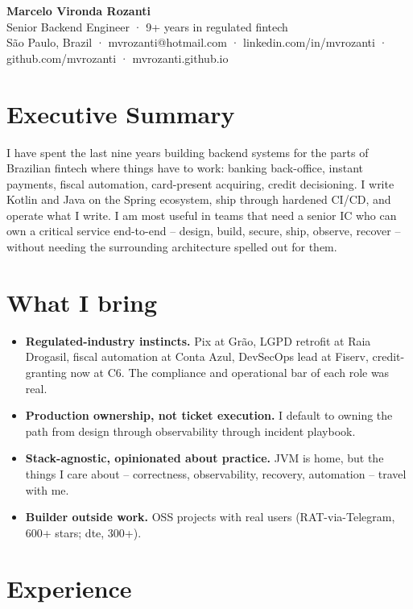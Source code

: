 \documentclass[11pt,a4paper]{article}
\begin{document}
\begin{center}
{\Huge\bfseries Marcelo Vironda Rozanti}\\[4pt]
{\large\color{accent} Senior Backend Engineer · 9+ years in regulated fintech}\\[3pt]
{\small São Paulo, Brazil · mvrozanti@hotmail.com · linkedin.com/in/mvrozanti · github.com/mvrozanti · mvrozanti.github.io}
\end{center}

\section{Executive Summary}
I have spent the last nine years building backend systems for the parts of Brazilian fintech where things have to work: banking back-office, instant payments, fiscal automation, card-present acquiring, credit decisioning. I write Kotlin and Java on the Spring ecosystem, ship through hardened CI/CD, and operate what I write. I am most useful in teams that need a senior IC who can own a critical service end-to-end -- design, build, secure, ship, observe, recover -- without needing the surrounding architecture spelled out for them.

\section{What I bring}
\begin{itemize}
\item \textbf{Regulated-industry instincts.} Pix at Grão, LGPD retrofit at Raia Drogasil, fiscal automation at Conta Azul, DevSecOps lead at Fiserv, credit-granting now at C6. The compliance and operational bar of each role was real.
\item \textbf{Production ownership, not ticket execution.} I default to owning the path from design through observability through incident playbook.
\item \textbf{Stack-agnostic, opinionated about practice.} JVM is home, but the things I care about -- correctness, observability, recovery, automation -- travel with me.
\item \textbf{Builder outside work.} OSS projects with real users (RAT-via-Telegram, 600+ stars; dte, 300+).
\end{itemize}

\section{Experience}
\end{document}
